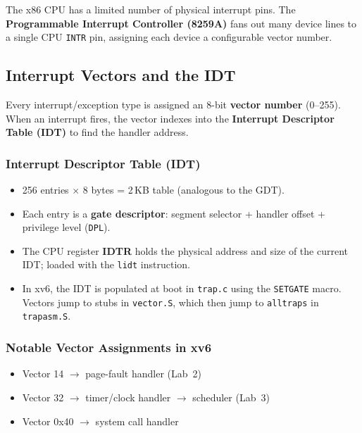\documentclass[11pt,a4paper]{article}
\newcommand{\term}[1]{\textbf{#1}}
\newcommand{\code}[1]{\texttt{#1}}
\newcommand{\xv}{xv6}
\begin{document}
The x86 CPU has a limited number of physical interrupt pins.  The
\term{Programmable Interrupt Controller (8259A)} fans out many device lines
to a single CPU \code{INTR} pin, assigning each device a configurable vector
number.

\subsection{Interrupt Vectors and the IDT}

\begin{keybox}
Every interrupt/exception type is assigned an 8-bit \term{vector number}
(0--255).  When an interrupt fires, the vector indexes into the
\term{Interrupt Descriptor Table (IDT)} to find the handler address.
\end{keybox}

\subsubsection{Interrupt Descriptor Table (IDT)}

\begin{itemize}
  \item 256 entries $\times$ 8 bytes = 2\,KB table (analogous to the GDT).
  \item Each entry is a \term{gate descriptor}: segment selector + handler
    offset + privilege level (\code{DPL}).
  \item The CPU register \term{IDTR} holds the physical address and size of
    the current IDT; loaded with the \code{lidt} instruction.
  \item In \xv, the IDT is populated at boot in \code{trap.c} using the
    \code{SETGATE} macro.  Vectors jump to stubs in \code{vector.S}, which
    then jump to \code{alltraps} in \code{trapasm.S}.
\end{itemize}

\subsubsection{Notable Vector Assignments in xv6}

\begin{itemize}
  \item Vector 14 $\to$ page-fault handler (Lab~2)
  \item Vector 32 $\to$ timer/clock handler $\to$ scheduler (Lab~3)
  \item Vector 0x40 $\to$ system call handler
\end{itemize}
\end{document}
